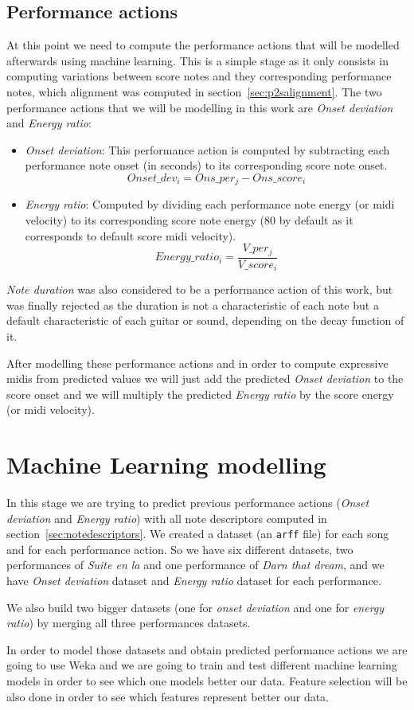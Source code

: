 \subsection{Performance actions}
At this point we need to compute the performance actions that will be modelled afterwards using machine learning. This is a simple stage as it only consists in computing variations between score notes and they corresponding performance notes, which alignment was computed in section~\ref{sec:p2salignment}. The two performance actions that we will be modelling in this work are \textit{Onset deviation} and \textit{Energy ratio}:

\begin{itemize}[noitemsep]
\item \textit{Onset deviation}: This performance action is computed by subtracting each performance note onset (in seconds) to its corresponding score note onset. $$Onset\_dev_i = Ons\_per_j - Ons\_score_i$$
\item \textit{Energy ratio}: Computed by dividing each performance note energy (or midi velocity) to its corresponding score note energy (80 by default as it corresponds to default score midi velocity).
$$Energy\_ratio_i = \frac{V\_per_j}{V\_score_i}$$
\end{itemize}

\textit{Note duration} was also considered to be a performance action of this work, but was finally rejected as the duration is not a characteristic of each note but a default characteristic of each guitar or sound, depending on the decay function of it.

After modelling these performance actions and in order to compute expressive midis from predicted values we will just add the predicted \textit{Onset deviation} to the score onset and we will multiply the predicted \textit{Energy ratio} by the score energy (or midi velocity).

\section{Machine Learning modelling}
In this stage we are trying to predict previous performance actions (\textit{Onset deviation} and \textit{Energy ratio}) with all note descriptors computed in section~\ref{sec:notedescriptors}.  We created a dataset (an \texttt{arff} file) for each song and for each performance action. So we have six different datasets, two performances of \textit{Suite en la} and one performance of \textit{Darn that dream}, and we have \textit{Onset deviation} dataset and \textit{Energy ratio} dataset for each performance.

We also build two bigger datasets (one for \textit{onset deviation} and one for \textit{energy ratio}) by merging all three performances datasets. 

In order to model those datasets and obtain predicted performance actions we are going to use Weka and we are going to train and test different machine learning models in order to see which one models better our data. Feature selection will be also done in order to see which features represent better our data.
\cleardoublepage

